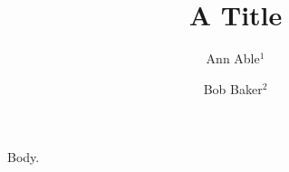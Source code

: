 \documentclass{llncs}
\begin{document}
\title{A Title}
\author{Ann Able$^{1}$ \and Bob Baker$^{2}$}
\maketitle
Body.
\end{document}
